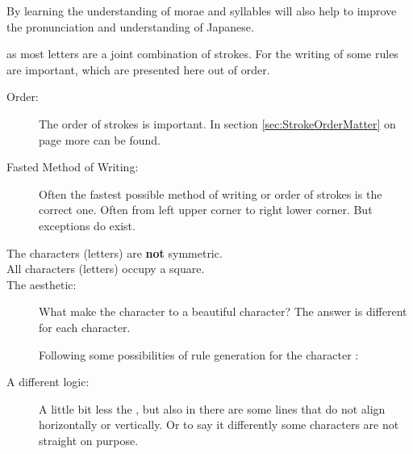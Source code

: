 By learning \textbf{\jtopic{}} the understanding of morae and syllables will
also help to improve the pronunciation and understanding of Japanese.

\textbf{\jtopic{}} as most letters are a joint combination of strokes. For the
writing of \textbf{\jtopic{}} some rules are important, which are presented
here out of order.

\begin{description}

\item[Order:] The order of strokes is important. In section
\ref{sec:StrokeOrderMatter} on page \pageref{sec:StrokeOrderMatter} more can be
found.

\item[Fasted Method of Writing:] Often the fastest possible method of writing
or order of strokes is the correct one.  Often from left upper corner to right
lower corner. But exceptions do exist.

\item[The characters (letters) are \textbf{not} symmetric.]

\item[All characters (letters) occupy a square.]

\item[The aesthetic:] What make the character to a beautiful character? The
answer is different for each character.


Following some possibilities of rule generation for the character
 :







\bigskip

\item[A different logic:] A little bit less the
        \hyperref[sec:\jscript{}]{\jtopic{}}, but also in \textbf{\jtopic{}}
        there are some lines that do not align horizontally  or vertically. Or
        to say it differently some characters are not straight on purpose.

\end{description}

